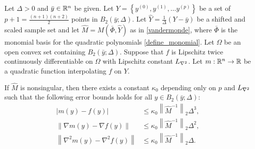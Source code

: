 \documentclass{article}
\newcommand{\real}{\mathbb R}
\begin{document}
\begin{corollary}  \label{error_bounds_shifted}
Let  $\Delta>0$ and $\bar y \in \mathbb R^n$ be given.
Let $Y = \left\{y^{(0)}, y^{(1)}, \ldots y^{(p)} \right\}$ be a set of $p+1=\frac{(n+1)(n+2)}{2}$ points in $B_2\left(\bar y;\Delta\right)$.
Let  $\hat{Y}=\frac{1}{\Delta} \left(Y-\bar y\right)$ be a shifted and scaled sample set and let $\hat{M} = M(\bar \Phi,\hat{Y})$ as in \cref{vandermonde},
where $\bar \Phi$ is the monomial basis for the quadratic polynomials \cref{define_monomial}.
Let $\Omega$ be an open convex set containing $B_2(\bar y;\Delta)$.
Suppose that $f$ is Lipschitz twice continuously differentiable on $\Omega$ with Lipschitz constant ${L_{\nabla^2}}$.
Let $m: \Rn \rightarrow \real$ be a quadratic function interpolating $f$ on $Y$.

If $\hat{M}$ is nonsingular, then there exists a constant $\kappa_0$ depending only on $p$ and ${L_{\nabla^2}}$ such that the following error bounds holds for all $y \in B_2\left(\bar y; \Delta\right)$:
\begin{align}
\left|m(y) - f(y)\right| &\le \kappa_0 \left\|\hat M^{-1}\right\|_2 \Delta^3,  \\
\left\|\nabla m(y) - \nabla f(y)\right\| &\le \kappa_0 \left\|\hat M^{-1} \right\|_2\Delta^2, \\
\left\|\nabla^2 m(y) - \nabla^2 f(y)\right\| &\le \kappa_0 \left\|\hat M^{-1} \right\|_2\Delta. 
\end{align}

\end{corollary}
\end{document}

